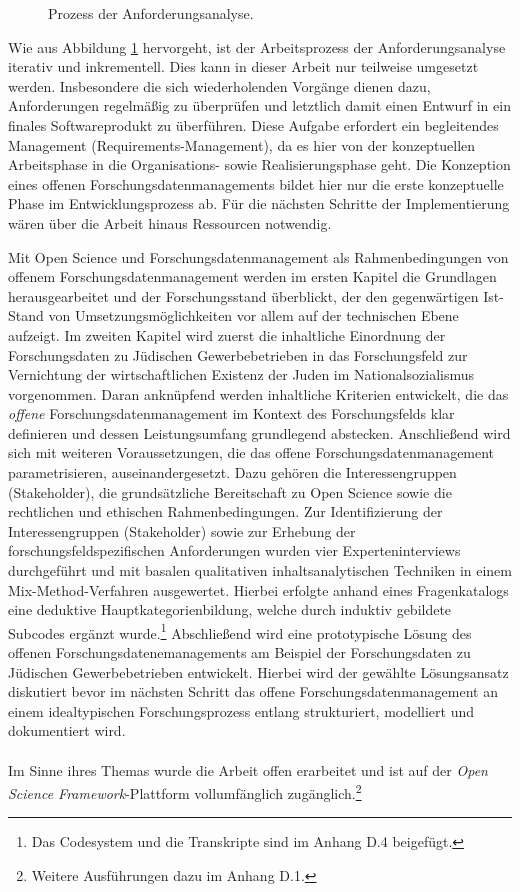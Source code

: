 \begin{figure}[h]
    \centering
    \caption{Prozess der Anforderungsanalyse.}
    \label{fig:anforderungsanalyse}
\end{figure}

Wie aus Abbildung \ref{fig:anforderungsanalyse} hervorgeht, ist der Arbeitsprozess der Anforderungsanalyse iterativ und inkrementell. Dies kann in dieser Arbeit nur teilweise umgesetzt werden. Insbesondere die sich wiederholenden Vorgänge dienen dazu, Anforderungen regelmäßig zu überprüfen und letztlich damit einen Entwurf in ein finales Softwareprodukt zu überführen. Diese Aufgabe erfordert ein begleitendes Management (Requirements-Management), da es hier von der konzeptuellen Arbeitsphase in die Organisations- sowie Realisierungsphase geht. Die Konzeption eines offenen Forschungsdatenmanagements bildet hier nur die erste konzeptuelle Phase im Entwicklungsprozess ab. Für die nächsten Schritte der Implementierung wären über die Arbeit hinaus Ressourcen notwendig.  

Mit Open Science und Forschungsdatenmanagement als Rahmenbedingungen von offenem Forschungsdatenmanagement werden im ersten Kapitel die Grundlagen herausgearbeitet und der Forschungsstand überblickt, der den gegenwärtigen Ist-Stand von Umsetzungsmöglichkeiten vor allem auf der technischen Ebene aufzeigt. Im zweiten Kapitel wird zuerst die inhaltliche Einordnung der Forschungsdaten zu Jüdischen Gewerbebetrieben in das Forschungsfeld zur Vernichtung der wirtschaftlichen Existenz der Juden im Nationalsozialismus vorgenommen. Daran anknüpfend werden inhaltliche Kriterien entwickelt, die das \textit{offene} Forschungsdatenmanagement im Kontext des Forschungsfelds klar definieren und dessen Leistungsumfang grundlegend abstecken. Anschließend wird sich mit weiteren Voraussetzungen, die das offene Forschungsdatenmanagement parametrisieren, auseinandergesetzt. Dazu gehören die Interessengruppen (Stakeholder), die grundsätzliche Bereitschaft zu Open Science sowie die rechtlichen und ethischen Rahmenbedingungen. Zur Identifizierung der Interessengruppen (Stakeholder) sowie zur Erhebung der forschungsfeldspezifischen Anforderungen wurden vier Experteninterviews durchgeführt und mit basalen qualitativen inhaltsanalytischen Techniken in einem Mix-Method-Verfahren ausgewertet. Hierbei erfolgte anhand eines Fragenkatalogs eine deduktive Hauptkategorienbildung, welche durch induktiv gebildete Subcodes ergänzt wurde.\footnote{Das Codesystem und die Transkripte sind im Anhang D.4 beigefügt.} Abschließend wird eine prototypische Lösung des offenen Forschungsdatenemanagements am Beispiel der Forschungsdaten zu Jüdischen Gewerbebetrieben entwickelt. Hierbei wird der gewählte Lösungsansatz diskutiert bevor im nächsten Schritt das offene Forschungsdatenmanagement an einem idealtypischen Forschungsprozess entlang strukturiert, modelliert und dokumentiert wird.\\ \\
Im Sinne ihres Themas wurde die Arbeit offen erarbeitet und ist auf der \textit{Open Science Framework}-Plattform vollumfänglich zugänglich.\footnote{Weitere Ausführungen dazu im Anhang D.1.}

